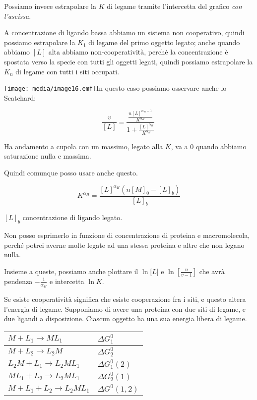 Possiamo invece estrapolare la \(K\) di legame tramite l'intercetta del
grafico \emph{con l'ascissa. }

A concentrazione di ligando bassa abbiamo un sistema non cooperativo,
quindi possiamo estrapolare la \(K_{1}\) di legame del primo oggetto
legato; anche quando abbiamo \(\left\lbrack L \right\rbrack\) alta
abbiamo non-cooperatività, perché la concentrazione è spostata verso la
specie con tutti gli oggetti legati, quindi possiamo estrapolare la
\(K_{n}\) di legame con tutti i siti occupati.

\texttt{[image: media/image16.emf]}In
questo caso possiamo osservare anche lo Scatchard:

\[\frac{v}{\left\lbrack L \right\rbrack} = \frac{\frac{n\left\lbrack L \right\rbrack^{\alpha_{H} - 1}}{K^{\alpha_{H}}}}{1 + \frac{\left\lbrack L \right\rbrack^{\alpha_{H}}}{K^{\alpha_{H}}}}\ \]

Ha andamento a cupola con un massimo, legato alla \(K\), va a 0 quando
abbiamo saturazione nulla e massima.

Quindi comunque posso usare anche questo.

\[K^{\alpha_{H}} = \frac{\left\lbrack L \right\rbrack^{\alpha_{H}}\left( n\left\lbrack M \right\rbrack_{0} - \left\lbrack L \right\rbrack_{b} \right)}{\left\lbrack L \right\rbrack_{b}}\]

\(\left\lbrack L \right\rbrack_{b}\) concentrazione di ligando legato.

Non posso esprimerlo in funzione di concentrazione di proteina e
macromolecola, perché potrei averne molte legate ad una stessa proteina
e altre che non legano nulla.

Insieme a queste, possiamo anche plottare il \(\ln{\lbrack L\rbrack}\) e
\(\ln\left\lbrack \frac{n}{v - 1} \right\rbrack\) che avrà pendenza
\(- \frac{1}{\alpha_{H}}\) e intercetta \(\ln K\).

Se esiste cooperatività significa che esiste cooperazione fra i siti, e
questo altera l'energia di legame. Supponiamo di avere una proteina con
due siti di legame, e due ligandi a disposizione. Ciascun oggetto ha una
sua energia libera di legame.

\begin{longtable}[c]{@{}ll@{}}
\toprule
\(M + L_{1} \rightarrow ML_{1}\) & \(\Delta G_{1}^{0}\)\tabularnewline
\midrule
\endhead
\(M + L_{2} \rightarrow L_{2}M\) & \(\Delta G_{2}^{0}\)\tabularnewline
\(L_{2}M + L_{1} \rightarrow L_{2}ML_{1}\) &
\(\Delta G_{1}^{0}\left( 2 \right)\)\tabularnewline
\(ML_{1} + L_{2} \rightarrow L_{2}ML_{1}\) &
\(\Delta G_{2}^{0}\left( 1 \right)\)\tabularnewline
\(M + L_{1} + L_{2} \rightarrow L_{2}ML_{1}\) &
\(\Delta G^{0}\left( 1,2 \right)\)\tabularnewline
\bottomrule
\end{longtable}

